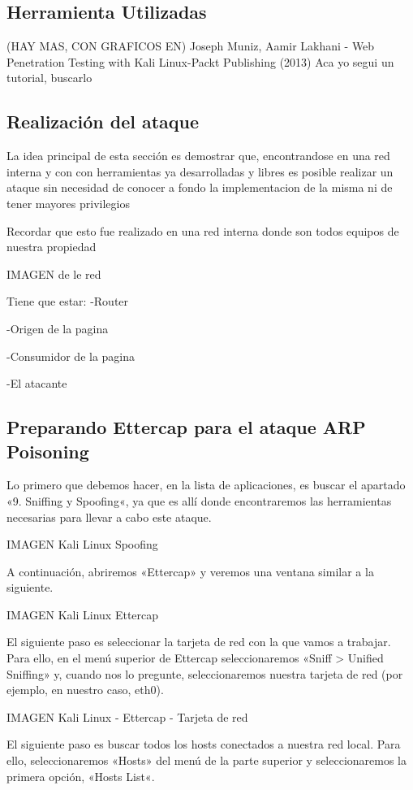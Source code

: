 
\subsection{Herramienta Utilizadas} 


(HAY MAS, CON GRAFICOS EN)
Joseph Muniz, Aamir Lakhani - Web Penetration Testing with Kali Linux-Packt Publishing (2013)
Aca yo segui un tutorial, buscarlo
\subsection{Realización del ataque}
La idea principal de esta sección es demostrar que, encontrandose en una red interna
y con con herramientas ya desarrolladas y libres es posible realizar un ataque 
sin necesidad de conocer a fondo la implementacion de la misma ni de tener mayores
privilegios

Recordar que esto fue realizado en una red interna donde son todos equipos de nuestra propiedad


IMAGEN de le red

Tiene que estar:
-Router

-Origen de la pagina

-Consumidor de la pagina

-El atacante

\subsection{Preparando Ettercap para el ataque ARP Poisoning}

Lo primero que debemos hacer, en la lista de aplicaciones, es buscar el apartado 
«9. Sniffing y Spoofing«, ya que es allí donde encontraremos las herramientas necesarias
 para llevar a cabo este ataque.

IMAGEN Kali Linux Spoofing

A continuación, abriremos «Ettercap» y veremos una ventana similar a la siguiente.

IMAGEN  Kali Linux Ettercap

El siguiente paso es seleccionar la tarjeta de red con la que vamos a trabajar. Para ello, en el menú superior de Ettercap seleccionaremos «Sniff > Unified Sniffing» y, cuando nos lo pregunte, seleccionaremos nuestra tarjeta de red (por ejemplo, en nuestro caso, eth0).

IMAGEN Kali Linux - Ettercap - Tarjeta de red

El siguiente paso es buscar todos los hosts conectados a nuestra red local. Para ello, seleccionaremos «Hosts» del menú de la parte superior y seleccionaremos la primera opción, «Hosts List«.

